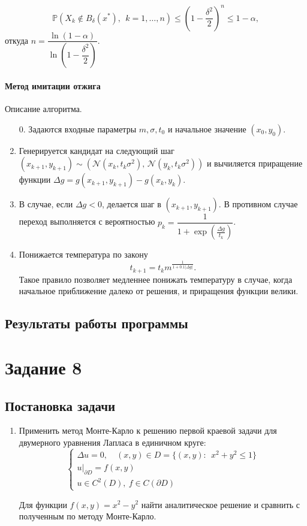 \documentclass[16pt]{article}
\begin{document}
$$\mathbb{P}(X_k \notin B_\delta(x^*), \ \ k = 1, \ldots, n) \leq \left(1 - \dfrac{\delta^2}{2}\right)^n \leq 1 - \alpha,$$
откуда $n = \dfrac{\ln(1 - \alpha)}{\ln\left(1 - \dfrac{\delta^2}{2}\right)}$.
\paragraph{Метод имитации отжига}
Описание алгоритма.
\begin{enumerate}
	\item[0.] Задаются входные параметры $m, \sigma, t_0$ и начальное значение $(x_0, y_0)$.
	\item Генерируется кандидат на следующий шаг $(x_{k+1}, y_{k+1}) \sim (\mathcal{N}(x_k, t_k\sigma^2),\, \mathcal{N}(y_k, t_k\sigma^2))$ и вычиляется приращение функции $\Delta g = g(x_{k+1}, y_{k+1}) - g(x_k, y_k)$.
	\item В случае, если $\Delta g < 0$, делается шаг в $(x_{k+1}, y_{k+1})$.
В противном случае переход выполняется с вероятностью 
$p_k = \dfrac{1}{1 + \exp\left(\frac{\Delta g}{t_k}\right)}$.
	\item Понижается температура по закону
$$t_{k+1} = t_k m^{\frac{1}{1+0.1|\Delta g|}}.$$
Такое правило позволяет медленнее понижать температуру в случае, когда начальное приближение далеко от решения, и приращения функции велики.
\end{enumerate}

\subsection{Результаты работы программы}

\section{Задание 8}
\subsection{Постановка задачи}
\begin{enumerate}
	\item Применить метод Монте-Карло к решению первой краевой задачи для двумерного уравнения Лапласа в единичном круге:
$$
\begin{cases}
\Delta u = 0, \quad (x, y) \in D = \{(x, y)\colon \ \ x^2 + y^2 \leq 1\}\\
u|_{\partial D} = f(x, y) \\
u \in C^2(D), \ f \in C(\partial D)
\end{cases}
$$

Для функции $f(x, y) = x^2 - y^2$ найти аналитическое решение и сравнить с полученным по методу Монте-Карло.
\end{enumerate}
\end{document}
